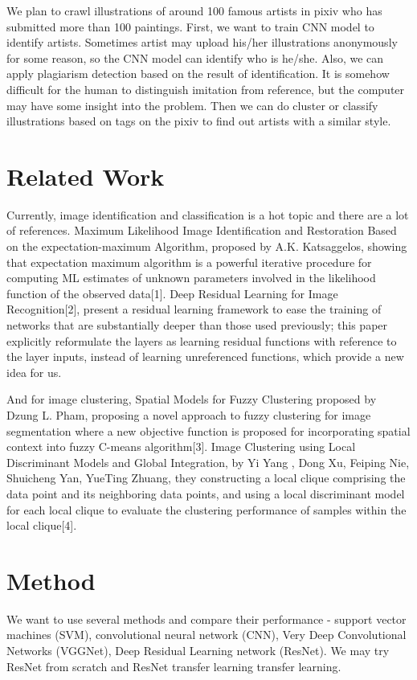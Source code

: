 \documentclass[11pt]{article}
\begin{document}
We plan to crawl illustrations of around 100 famous artists in pixiv who has submitted more than 100 paintings. First, we want to train CNN model to identify artists. Sometimes artist may upload his/her illustrations anonymously for some reason, so the CNN model can identify who is he/she. Also, we can apply plagiarism detection based on the result of identification. It is somehow difficult for the human to distinguish imitation from reference, but the computer may have some insight into the problem. Then we can do cluster or classify illustrations based on tags on the pixiv to find out artists with a similar style.


\section{Related Work}
Currently, image identification and classification is a hot topic and there are a lot of references. Maximum Likelihood Image Identification and Restoration Based on the expectation-maximum Algorithm, proposed by A.K. Katsaggelos,  showing that expectation maximum algorithm is a powerful iterative procedure for computing ML estimates of unknown parameters involved in the likelihood function of the observed data[1]. Deep Residual Learning for Image Recognition[2], present a residual learning framework to ease the training of networks that are substantially deeper than those used previously; this paper explicitly reformulate the layers as learning residual functions with reference to the layer inputs, instead of learning unreferenced functions, which provide a new idea for us. 

And for image clustering, Spatial Models for Fuzzy Clustering proposed by Dzung L. Pham, proposing a novel approach to fuzzy clustering for image segmentation where a new objective function is proposed for incorporating spatial context into fuzzy C-means algorithm[3]. Image Clustering using Local Discriminant Models and Global Integration, by Yi Yang , Dong Xu, Feiping Nie, Shuicheng Yan, YueTing Zhuang,  they constructing a local clique comprising the data point and its neighboring data points, and using a local discriminant model for each local clique to evaluate the clustering performance of samples within the local clique[4].


\section{Method}

We want to use several methods and compare their performance - support vector machines (SVM), convolutional neural network (CNN), Very Deep Convolutional Networks (VGGNet), Deep Residual Learning network (ResNet). We may try ResNet from scratch and ResNet transfer learning transfer learning.
\end{document}
